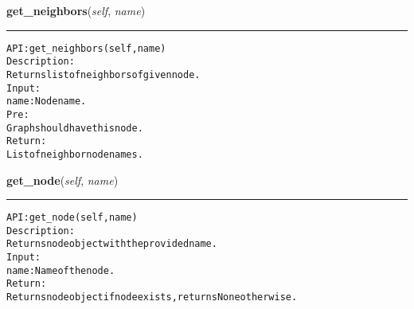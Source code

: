     \vspace{0.5ex}

\hspace{.8\funcindent}\begin{boxedminipage}{\funcwidth}

    \raggedright \textbf{get\_neighbors}(\textit{self}, \textit{name})

    \vspace{-1.5ex}

    \rule{\textwidth}{0.5\fboxrule}
\setlength{\parskip}{2ex}
\begin{alltt}

API: get\_neighbors(self, name)
Description:
Returns list of neighbors of given node.
Input:
    name: Node name.
Pre:
    Graph should have this node.
Return:
    List of neighbor node names.
\end{alltt}

\setlength{\parskip}{1ex}
    \end{boxedminipage}

    \label{coinor:gimpy:graph:Graph:get_node}

    \vspace{0.5ex}

\hspace{.8\funcindent}\begin{boxedminipage}{\funcwidth}

    \raggedright \textbf{get\_node}(\textit{self}, \textit{name})

    \vspace{-1.5ex}

    \rule{\textwidth}{0.5\fboxrule}
\setlength{\parskip}{2ex}
\begin{alltt}

API: get\_node(self, name)
Description:
Returns node object with the provided name.
Input:
    name: Name of the node.
Return:
    Returns node object if node exists, returns None otherwise.
\end{alltt}

\setlength{\parskip}{1ex}
    \end{boxedminipage}

    \label{coinor:gimpy:graph:Graph:get_node_attr}

